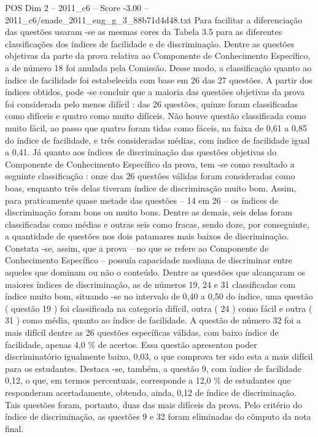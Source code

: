 \begin{textsample}{POS Dim 2 – 2011\_c6 – Score -3.00 – 2011\_c6/enade\_2011\_eng\_g\_3\_88b71d4d48.txt}
Para facilitar a diferenciação das questões usaram -se as mesmas cores da Tabela 3.5 para as diferentes classificações dos índices de facilidade e de discriminação.
Dentre as questões objetivas da parte da prova relativa ao Componente de Conhecimento Específico, a de número 18 foi anulada pela Comissão.
Desse modo, a classificação quanto ao índice de facilidade foi estabelecida com base em 26 das 27 questões.
A partir dos índices obtidos, pode -se concluir que a maioria das questões objetivas da prova foi considerada pelo menos difícil : das 26 questões, quinze foram classificadas como difíceis e quatro como muito difíceis.
Não houve questão classificada como muito fácil, ao passo que quatro foram tidas como fáceis, na faixa de 0,61 a 0,85 do índice de facilidade, e três consideradas médias, com índice de facilidade igual a 0,41.
Já quanto aos índices de discriminação das questões objetivas do Componente de Conhecimento Específico da prova, tem -se como resultado a seguinte classificação : onze das 26 questões válidas foram consideradas como boas, enquanto três delas tiveram índice de discriminação muito bom.
Assim, para praticamente quase metade das questões – 14 em 26 – os índices de discriminação foram bons ou muito bons.
Dentre as demais, seis delas foram classificadas como médias e outras seis como fracas, sendo doze, por conseguinte, a quantidade de questões nos dois patamares mais baixos de discriminação.
Constata -se, assim, que a prova – no que se refere ao Componente de Conhecimento Específico – possuía capacidade mediana de discriminar entre aqueles que dominam ou não o conteúdo.
Dentre as questões que alcançaram os maiores índices de discriminação, as de números 19, 24 e 31 classificadas com índice muito bom, situando -se no intervalo de 0,40 a 0,50 do índice, uma questão ( questão 19 ) foi classificada na categoria difícil, outra ( 24 ) como fácil e outra ( 31 ) como média, quanto ao índice de facilidade.
A questão de número 32 foi a mais difícil dentre as 26 questões específicas válidas, com baixo índice de facilidade, apenas 4,0 \% de acertos.
Essa questão apresentou poder discriminatório igualmente baixo, 0,03, o que comprova ter sido esta a mais difícil para os estudantes.
Destaca -se, também, a questão 9, com índice de facilidade 0,12, o que, em termos percentuais, corresponde a 12,0 \% de estudantes que responderam acertadamente, obtendo, ainda, 0,12 de índice de discriminação.
Tais questões foram, portanto, duas das mais difíceis da prova.
Pelo critério do índice de discriminação, as questões 9 e 32 foram eliminadas do cômputo da nota final.

\end{textsample}
